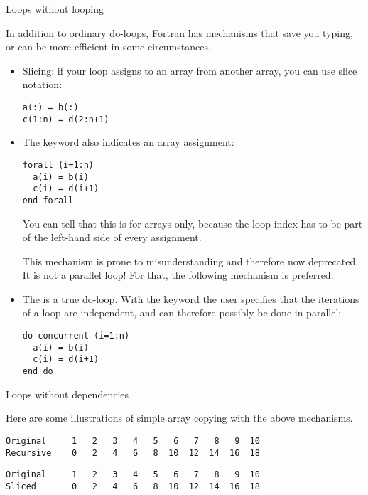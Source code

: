 
 {Loops without looping}

In addition to ordinary do-loops, Fortran has mechanisms that save you
typing, or can be more efficient in some circumstances.
\begin{itemize}
\item Slicing: if your loop assigns to an array from another array,
  you can use slice notation:
\begin{verbatim}
a(:) = b(:)
c(1:n) = d(2:n+1)
\end{verbatim}
\item The  keyword also indicates an array assignment:
\begin{verbatim}
forall (i=1:n)
  a(i) = b(i)
  c(i) = d(i+1)
end forall
\end{verbatim}
You can tell that this is for arrays only, because the loop index has
to be part of the left-hand side of every assignment.

This mechanism is prone to misunderstanding and therefore now
deprecated.
It is not a parallel loop! For that, the following mechanism is preferred.
\item The  is a true do-loop. With the
   keyword the user specifies that the
  iterations of a loop are independent, and can therefore possibly be
  done in parallel:
\begin{verbatim}
do concurrent (i=1:n)
  a(i) = b(i)
  c(i) = d(i+1)
end do
\end{verbatim}
\end{itemize}

 {Loops without dependencies}

Here are some illustrations of simple array copying with the above
mechanisms.

\begin{verbatim}
Original     1   2   3   4   5   6   7   8   9  10
Recursive    0   2   4   6   8  10  12  14  16  18
\end{verbatim}

\begin{verbatim}
Original     1   2   3   4   5   6   7   8   9  10
Sliced       0   2   4   6   8  10  12  14  16  18
\end{verbatim}

